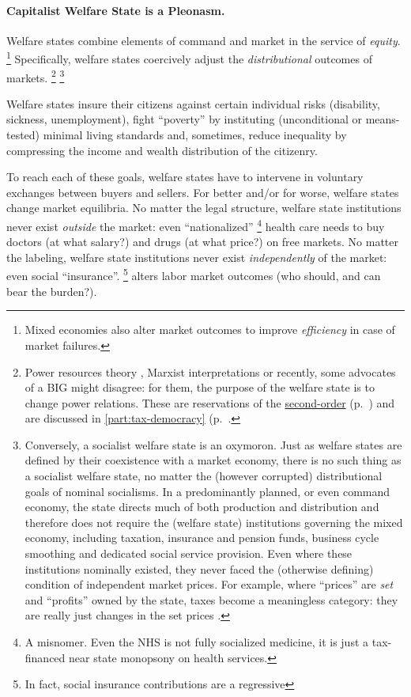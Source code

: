 \paragraph{Capitalist Welfare State is a Pleonasm.}  \label{sec:interface}
Welfare states combine elements of command and market in the service of \emph{equity}.
\footnote{
	Mixed economies also alter market outcomes to improve \emph{efficiency} in case of market failures.
}
Specifically, welfare states coercively adjust the \emph{distributional} outcomes of markets.
\footnote{
	Power resources theory \citep[for example][]{Korpi2003}, Marxist interpretations \citep[for example][]{Offe1972} or recently, some advocates of a \gls{BIG} might disagree:
	for them, the purpose of the welfare state is to change power relations.
	These are reservations of the \hyperref[sec:epistemology]{second-order} (p.~\pageref{sec:epistemology}) and are discussed in \autoref{part:tax-democracy} (p.~\pageref{part:tax-democracy}.
	}
\footnote{
	Conversely, a socialist welfare state is an oxymoron.
	Just as welfare states are defined by their coexistence with a market economy, there is no such thing as a socialist welfare state, no matter the (however corrupted) distributional goals of nominal socialisms.
	In a predominantly planned, or even command economy, the state directs much of both production and distribution and therefore does not require the (welfare state) institutions governing the mixed economy, including taxation, insurance and pension funds, business cycle smoothing and dedicated social service provision.
	Even where these institutions nominally existed, they never faced the (otherwise defining) condition of independent market prices.
	For example, where ``prices'' are \emph{set} and ``profits'' owned by the state, taxes become a meaningless category:
	they are really just changes in the set prices \citep[for example,][23]{Bonker2006}.
}

Welfare states insure their citizens against certain individual risks (disability, sickness, unemployment), fight ``poverty'' by instituting (unconditional or means-tested) minimal living standards and, sometimes, reduce inequality by compressing the income and wealth distribution of the citizenry.

To reach each of these goals, welfare states have to intervene in voluntary exchanges between buyers and sellers.
For better and/or for worse, welfare states change market equilibria.
No matter the legal structure, welfare state institutions never exist \emph{outside} the market:
even ``nationalized''
\footnote{
	A misnomer.
	Even the \gls{NHS} is not fully socialized medicine, it is just a tax-financed near state monopsony on health services.
}
health care needs to buy doctors (at what salary?) and drugs (at what price?) on free markets.
No matter the labeling, welfare state institutions never exist \emph{independently} of the market:
even social ``insurance''.
\footnote{
	In fact, social insurance contributions are a regressive 
}
alters labor market outcomes (who should, and can bear the burden?).

